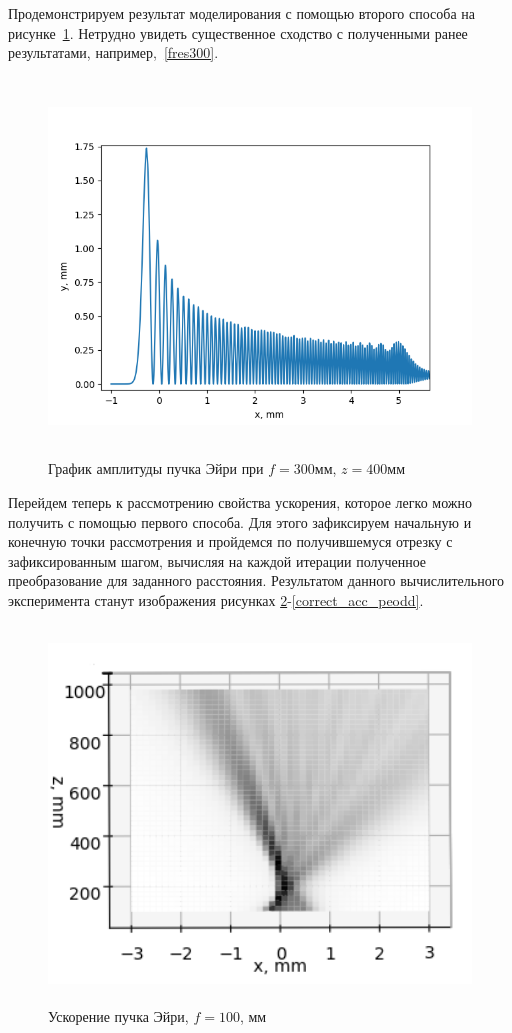 {    Продемонстрируем результат моделирования с помощью второго способа на рисунке~\ref{four_fres_300_400}.
    Нетрудно увидеть существенное сходство с полученными ранее результатами, например,~\ref{fres300}.
    \begin{figure}[H]
        \centering
        \includegraphics[height = 10cm]{plots/four_fres_300_400.png}
        \caption{График амплитуды пучка Эйри при $f = 300$мм, $z = 400$мм}
        \label{four_fres_300_400}
    \end{figure}
    \vspace{0.5cm}

    Перейдем теперь к рассмотрению свойства ускорения, которое легко можно получить с помощью первого способа.
    Для этого зафиксируем начальную и конечную точки рассмотрения и пройдемся по получившемуся отрезку с зафиксированным шагом,
    вычисляя на каждой итерации полученное преобразование для заданного расстояния.
    Результатом данного вычислительного эксперимента станут изображения рисунках \ref{correct_acc}-\ref{correct_acc_peodd}.
    \begin{figure}[H]
        \centering
        \includegraphics[height = 10cm]{plots/ai_acc_before_focus.png}
        \caption{Ускорение пучка Эйри, $f = 100$, мм}
        \label{correct_acc}
    \end{figure}

}
